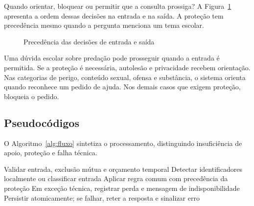 Quando orientar, bloquear ou permitir que a consulta prossiga? A Figura~\ref{fig:decisao} apresenta a ordem dessas decisões na entrada e na saída. A proteção tem precedência mesmo quando a pergunta menciona um tema escolar.

\begin{figure}[htbp]\centering
\caption{Precedência das decisões de entrada e saída}\label{fig:decisao}

\end{figure}

Uma dúvida escolar sobre predação pode prosseguir quando a entrada é permitida. Se a proteção é necessária, autolesão e privacidade recebem orientação. Nas categorias de perigo, conteúdo sexual, ofensa e substância, o sistema orienta quando reconhece um pedido de ajuda. Nos demais casos que exigem proteção, bloqueia o pedido.

\subsection{Pseudocódigos}

O Algoritmo~\ref{alg:fluxo} sintetiza o processamento, distinguindo insuficiência de apoio, proteção e falha técnica.

\begin{algorithm}[htbp]
\caption{Fluxo resumido da versão atual}\label{alg:fluxo}
Validar entrada, exclusão mútua e orçamento temporal\;
Detectar identificadores localmente ou classificar entrada\;
Aplicar regra comum com precedência da proteção\;
Em exceção técnica, registrar perda e mensagem de indisponibilidade\;
Persistir atomicamente; se falhar, reter a resposta e sinalizar erro\;
\par{}
\end{algorithm}


